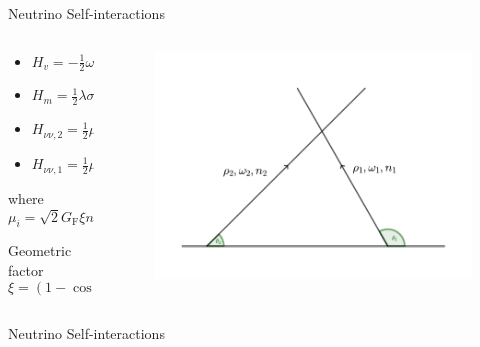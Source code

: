 \documentclass[9pt]{beamer}
\begin{document}
\begin{darkframes}
\begin{frame}{Neutrino Self-interactions}
\begin{columns}[T]
\begin{column}{0.3\textwidth}
\begin{itemize}
   \item $H_v = - \frac{1}{2}\omega \sigma_3 $
   \item $H_m = \frac{1}{2}\lambda \sigma_3$
   \item $H_{\nu\nu,2} = \frac{1}{2}\mu_1 \rho_1$
   \item $H_{\nu\nu,1} = \frac{1}{2}\mu_2 \rho_2$
\end{itemize}
where
\begin{equation*}
   \mu_i = \sqrt{2} G_{\mathrm F} \xi n_i
\end{equation*}

Geometric factor
\begin{equation*}
\xi = (1-\cos(\theta_1-\theta_2))
\end{equation*}



\end{column}

\begin{column}{0.7\textwidth}
\begin{figure}
   \includegraphics[width=\textwidth]{assets/two-beams-model}
\end{figure}
\end{column}


\end{columns}


\end{frame}


\begin{frame}{Neutrino Self-interactions}


\end{frame}
\end{darkframes}
\end{document}
